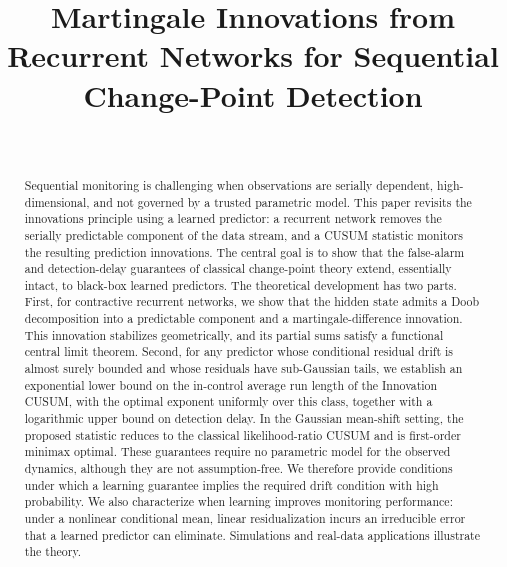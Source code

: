 \documentclass[bj,authoryear]{imsart}
\theoremstyle{plain}
\theoremstyle{definition}
\begin{document}
\begin{frontmatter}

\title{Martingale Innovations from Recurrent Networks
       for Sequential Change-Point Detection}

\author{~%
  }
\address{Institute of Statistical Science, Academia Sinica,
  128 Academia Road, Section~2, Nankang, Taipei 115, Taiwan.
  }

\begin{abstract}
Sequential monitoring is challenging when observations are serially dependent, high-dimensional, and not governed by a trusted parametric model. This paper revisits the innovations principle using a learned predictor: a recurrent network removes the serially predictable component of the data stream, and a CUSUM statistic monitors the resulting prediction innovations. The central goal is to show that the false-alarm and detection-delay guarantees of classical change-point theory extend, essentially intact, to black-box learned predictors.
%
The theoretical development has two parts. First, for contractive recurrent networks, we show that the hidden state admits a Doob decomposition into a predictable component and a martingale-difference innovation. This innovation stabilizes geometrically, and its partial sums satisfy a functional central limit theorem. Second, for any predictor whose conditional residual drift is almost surely bounded and whose residuals have sub-Gaussian tails, we establish an exponential lower bound on the in-control average run length of the Innovation CUSUM, with the optimal exponent uniformly over this class, together with a logarithmic upper bound on detection delay.
%
In the Gaussian mean-shift setting, the proposed statistic reduces to the classical likelihood-ratio CUSUM and is first-order minimax optimal. These guarantees require no parametric model for the observed dynamics, although they are not assumption-free. We therefore provide conditions under which a learning guarantee implies the required drift condition with high probability. We also characterize when learning improves monitoring performance: under a nonlinear conditional mean, linear residualization incurs an irreducible error that a learned predictor can eliminate. Simulations and real-data applications illustrate the theory.
\end{abstract}

\begin{keyword}
\end{keyword}

\begin{keyword}[class=MSC]
\end{keyword}

\end{frontmatter}
\end{document}
